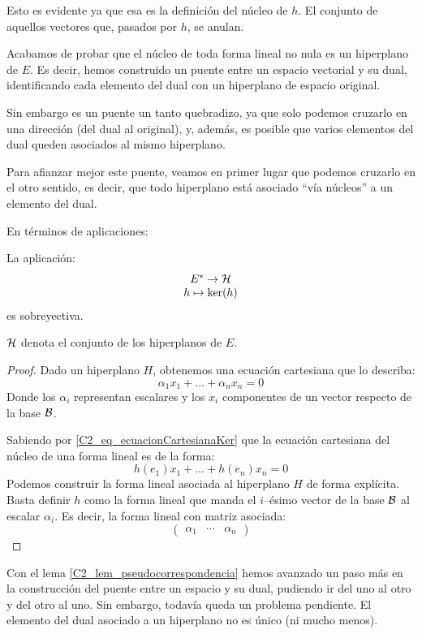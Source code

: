 Esto es evidente ya que esa es la definición del núcleo de $h$. El conjunto de aquellos vectores que, pasados por $h$, se anulan.

Acabamos de probar que el núcleo de toda forma lineal no nula es un hiperplano de $E$. Es decir, hemos construido un puente entre un espacio vectorial y su dual, identificando cada elemento del dual con un hiperplano de espacio original.

Sin embargo es un puente un tanto quebradizo, ya que solo podemos cruzarlo en una dirección (del dual al original), y, además, es posible que varios elementos del dual queden asociados al mismo hiperplano.

Para afianzar mejor este puente, veamos en primer lugar que podemos cruzarlo en el otro sentido, es decir, que todo hiperplano está asociado ``vía núcleos'' a un elemento del dual.

En términos de aplicaciones:
\begin{lem}
	\label{C2_lem_pseudocorrespondencia}
	La aplicación:
	\[\begin{array}{c}
	E^*\to\mathcal{H}\\
	h\mapsto \ker(h)
	\end{array}\]
	es sobreyectiva.
	
	$\mathcal{H}$ denota el conjunto de los hiperplanos de $E$.
\end{lem}
\begin{proof}
	Dado un hiperplano $H$, obtenemos una ecuación cartesiana que lo describa:
	\[\alpha_1x_1+\dots+\alpha_nx_n=0\]
	Donde los $\alpha_i$ representan escalares y los $x_i$ componentes de un vector respecto de la base $\mathcal{B}$.
		
	Sabiendo por \eqref{C2_eq_ecuacionCartesianaKer} que la ecuación cartesiana del núcleo de una forma lineal es de la forma:
	\[h(e_1)x_1+\dots+h(e_n)x_n=0\]
	Podemos construir la forma lineal asociada al hiperplano $H$ de forma explícita. Basta definir $h$ como la forma lineal que manda el $i$--ésimo vector de la base $\mathcal{B}$ al escalar $\alpha_i$. Es decir, la forma lineal con matriz asociada:
	\[\begin{pmatrix}
	\alpha_1 & \cdots & \alpha_n
	\end{pmatrix}\]
\end{proof}

Con el lema \ref{C2_lem_pseudocorrespondencia} hemos avanzado un paso más en la construcción del puente entre un espacio y su dual, pudiendo ir del uno al otro y del otro al uno. Sin embargo, todavía queda un problema pendiente. El elemento del dual asociado a un hiperplano no es único (ni mucho menos).

